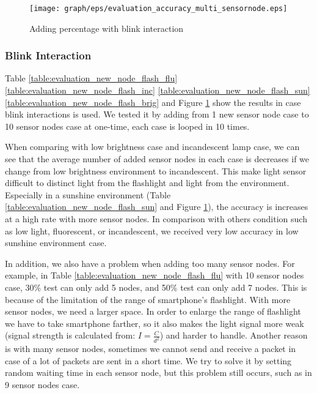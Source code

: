 \begin{figure}[htbp]
\centering
\texttt{[image: graph/eps/evaluation\_accuracy\_multi\_sensornode.eps]}
\caption{Adding percentage with blink interaction}
\label{fig:evaluation_accuracy_blink_some}
\end{figure}

\subsubsection{Blink Interaction}

Table \ref{table:evaluation_new_node_flash_flu} \ref{table:evaluation_new_node_flash_inc} \ref{table:evaluation_new_node_flash_sun} \ref{table:evaluation_new_node_flash_brig} and Figure \ref{fig:evaluation_accuracy_blink_some} show the results in case blink interactions is used. We tested it by adding from 1 new sensor node case to 10 sensor nodes case at one-time, each case is looped in 10 times.

When comparing with low brightness case and incandescent lamp case, we can see that the average number of added sensor nodes in each case is decreases if we change from low brightness environment to incandescent. This make light sensor difficult to distinct light from the flashlight and light from the environment. Especially in a sunshine environment (Table \ref{table:evaluation_new_node_flash_sun} and Figure \ref{fig:evaluation_accuracy_blink_some}), the accuracy is increases at a high rate with more sensor nodes. In comparison with others condition such as low light, fluorescent, or incandescent, we received very low accuracy in low sunshine environment case.

In addition, we also have a problem when adding too many sensor nodes. For example, in Table \ref{table:evaluation_new_node_flash_flu} with 10 sensor nodes case, 30\% test can only add 5 nodes, and 50\% test can only add 7 nodes. This is because of the limitation of the range of smartphone's flashlight. With more sensor nodes, we need a larger space. In order to enlarge the range of flashlight we have to take smartphone farther, so it also makes the light signal more weak (signal strength is calculated from: $I=\frac{C}{d^2}$) and harder to handle. Another reason is with many sensor nodes, sometimes we cannot send and receive a packet in case of a lot of packets are sent in a short time. We try to solve it by setting random waiting time in each sensor node, but this problem still occurs, such as in 9 sensor nodes case.

